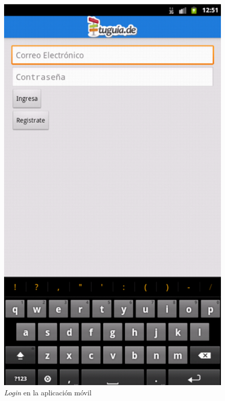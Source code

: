 \begin{figure}[h]
	\begin{center}
		\includegraphics[scale=0.55]{imagenes/login.png}
	\end{center}
	\caption{
		\label{fig:login}
		\textit{Login} en la aplicación móvil
	}
\end{figure}

